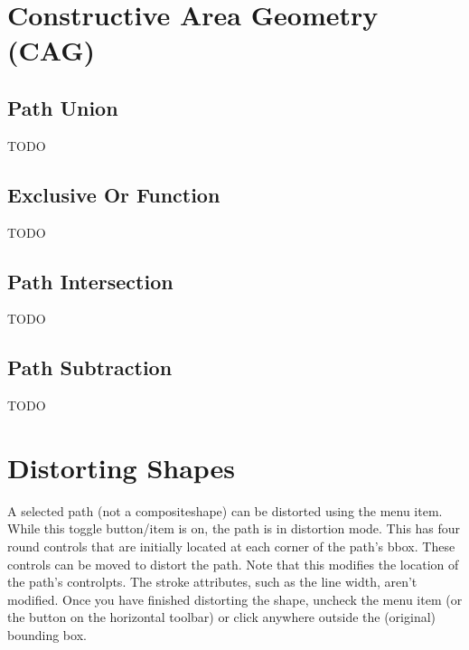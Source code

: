 
\section{Constructive Area Geometry (CAG)}\label{sec:cag}

\subsection{Path Union}\label{sec:pathunion}




TODO


\subsection{Exclusive Or Function}\label{sec:xorpath}



TODO


\subsection{Path Intersection}\label{sec:pathintersect}



TODO


\subsection{Path Subtraction}\label{sec:pathsubtract}



TODO


\section{Distorting Shapes}\label{sec:distort}


A selected \gls{path} (not a \gls{compositeshape}) can be distorted using the
 menu item. While this toggle
button\slash item is on, the \gls{path} is in distortion mode.
This has four round controls that are initially located at each
corner of the path's \gls{bbox}. These controls can be moved to
distort the path.  Note that this modifies the location of the
path's \glspl{controlpt}. The stroke attributes, such as the line
width, aren't modified. Once you have finished distorting the shape,
uncheck the  menu item (or the
button on the horizontal \gls{toolbar}) or click
anywhere outside the (original) bounding box.

